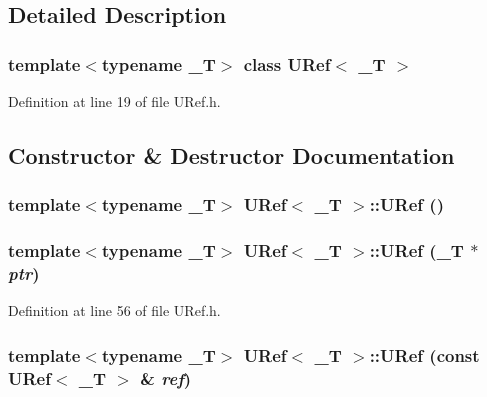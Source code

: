 \subsection{Detailed Description}
\subsubsection*{template$<$typename \_\-T$>$ class URef$<$ \_\-T $>$}



Definition at line 19 of file URef.h.

\subsection{Constructor \& Destructor Documentation}
\hypertarget{class_u_ref_6286bbc19c27c466e899dcc18b77f2bb}{
\subsubsection[{URef}]{\setlength{\rightskip}{0pt plus 5cm}template$<$typename \_\-T$>$ {\bf URef}$<$ \_\-T $>$::{\bf URef} ()}}
\label{class_u_ref_6286bbc19c27c466e899dcc18b77f2bb}


\hypertarget{class_u_ref_c777ca0d066ea150f871d66bdb58c8a3}{
\subsubsection[{URef}]{\setlength{\rightskip}{0pt plus 5cm}template$<$typename \_\-T$>$ {\bf URef}$<$ \_\-T $>$::{\bf URef} (\_\-T $\ast$ {\em ptr})}}
\label{class_u_ref_c777ca0d066ea150f871d66bdb58c8a3}




Definition at line 56 of file URef.h.\hypertarget{class_u_ref_b08d8841363db937ecff64b0c4a3708a}{
\subsubsection[{URef}]{\setlength{\rightskip}{0pt plus 5cm}template$<$typename \_\-T$>$ {\bf URef}$<$ \_\-T $>$::{\bf URef} (const {\bf URef}$<$ \_\-T $>$ \& {\em ref})}}
\label{class_u_ref_b08d8841363db937ecff64b0c4a3708a}




